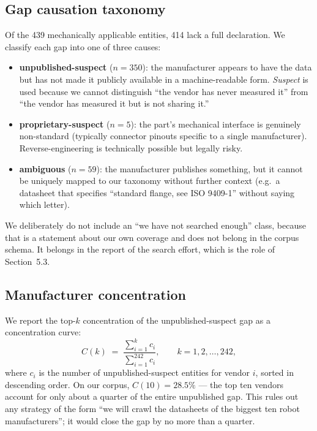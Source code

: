 \subsection{Gap causation taxonomy}

Of the 439 mechanically applicable entities, 414 lack a full
declaration. We classify each gap into one of three causes:

\begin{itemize}[nosep,leftmargin=*]
\item \textbf{unpublished-suspect} ($n=350$): the manufacturer
appears to have the data but has not made it publicly available in a
machine-readable form. \emph{Suspect} is used because we cannot
distinguish ``the vendor has never measured it'' from ``the vendor
has measured it but is not sharing it.''

\item \textbf{proprietary-suspect} ($n=5$): the part's mechanical
interface is genuinely non-standard (typically connector pinouts
specific to a single manufacturer). Reverse-engineering is technically
possible but legally risky.

\item \textbf{ambiguous} ($n=59$): the manufacturer publishes
something, but it cannot be uniquely mapped to our taxonomy without
further context (e.g.\ a datasheet that specifies ``standard flange,
see ISO 9409-1'' without saying which letter).
\end{itemize}

We deliberately do not include an ``we have not searched enough''
class, because that is a statement about our own coverage and does
not belong in the corpus schema. It belongs in the report of the
search effort, which is the role of Section~5.3.

\subsection{Manufacturer concentration}

We report the top-$k$ concentration of the unpublished-suspect gap
as a concentration curve:
\begin{equation}
  C(k) \;=\; \frac{\sum_{i=1}^{k} c_i}{\sum_{i=1}^{242} c_i},
  \qquad k = 1, 2, \ldots, 242,
  \label{eq:conc}
\end{equation}
where $c_i$ is the number of unpublished-suspect entities for vendor
$i$, sorted in descending order. On our corpus, $C(10) = 28.5\%$ —
the top ten vendors account for only about a quarter of the entire
unpublished gap. This rules out any strategy of the form ``we will
crawl the datasheets of the biggest ten robot manufacturers''; it
would close the gap by no more than a quarter.

